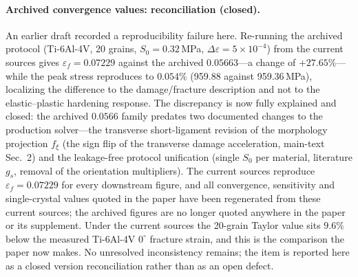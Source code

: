 \documentclass[12pt,a4paper,twocolumn]{article}
\providecommand{\ang}[1]{\ensuremath{#1^{\circ}}}
\begin{document}
\paragraph{Archived convergence values: reconciliation (closed).}
An earlier draft recorded a reproducibility failure here. Re-running the archived
protocol (Ti-6Al-4V, 20 grains, $S_0 = 0.32$\,MPa, $\Delta\varepsilon = 5\times10^{-4}$) from the current
sources gives $\varepsilon_f = 0.07229$ against the archived $0.05663$---a change of $+27.65\%$---while
the peak stress reproduces to $0.054\%$ (959.88 against 959.36\,MPa), localizing the difference to the
damage/fracture description and not to the elastic--plastic hardening response. The discrepancy is now fully
explained and closed: the archived $0.0566$ family predates two documented changes to the production
solver---the transverse short-ligament revision of the morphology projection $f_\xi$ (the sign flip of the
transverse damage acceleration, main-text Sec.~2) and the leakage-free protocol unification (single $S_0$
per material, literature $g_s$, removal of the orientation multipliers). The current sources reproduce
$\varepsilon_f = 0.07229$ for every downstream figure, and all convergence, sensitivity and single-crystal
values quoted in the paper have been regenerated from these current sources; the archived figures are no
longer quoted anywhere in the paper or its supplement. Under the current sources the 20-grain Taylor value
sits $9.6\%$ below the measured Ti-6Al-4V $\ang{0}$ fracture strain, and this is the comparison the paper
now makes. No unresolved inconsistency remains; the item is reported here as a closed version reconciliation
rather than as an open defect.
\end{document}

